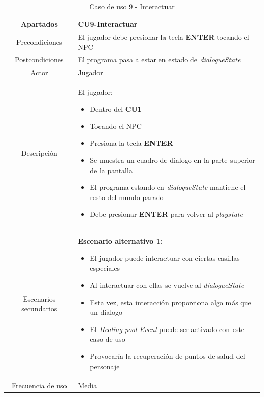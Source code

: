 \documentclass[a4paper]{article}
\begin{document}
\begin{table}[!ht]
    \centering
    \begin{tabular}{|c|p{12cm}|}
        \hline
        \textbf{Apartados}     & \textbf{CU9-Interactuar}                                                    \\
        \hline
        Precondiciones         & El jugador debe presionar la tecla \textbf{ENTER} tocando el NPC            \\
        \hline
        Postcondiciones        & El programa pasa a estar en estado de \textit{dialogueState}                \\
        \hline
        Actor                  & Jugador                                                                     \\
        \hline
        Descripción            & El jugador:
        \begin{itemize}
            \item Dentro del \textbf{CU1}
            \item Tocando el NPC
            \item Presiona la tecla \textbf{ENTER}
            \item[\faAngleRight] Se muestra un cuadro de dialogo en la parte superior de la pantalla
            \item[\faAngleRight] El programa estando en \textit{dialogueState} mantiene el resto del mundo parado
            \item Debe presionar \textbf{ENTER} para volver al \textit{playstate}
        \end{itemize} \\
        \hline
        Escenarios secundarios & \textbf{Escenario alternativo 1:}
        \begin{itemize}
            \item El jugador puede interactuar con ciertas casillas especiales
            \item Al interactuar con ellas se vuelve al \textit{dialogueState}
            \item Esta vez, esta interacción proporciona algo más que un dialogo
            \item El \textit{Healing pool Event} puede ser activado con este caso de uso
            \item Provocaría la recuperación de puntos de salud del personaje
        \end{itemize}                          \\
        \hline
        Frecuencia de uso      & Media                                                                       \\
        \hline
    \end{tabular}
    \caption{Caso de uso 9 - Interactuar}
    \label{tab:casosdeuso9-table}
\end{table}
\end{document}
